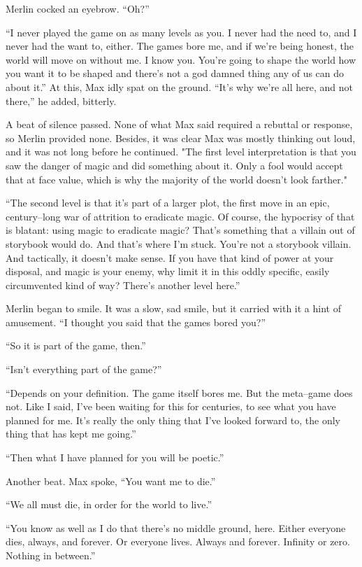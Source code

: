 Merlin cocked an eyebrow. “Oh?”

“I never played the game on as many levels as you. I never had the need to, and I never had the want to, either. The games bore me, and if we’re being honest, the world will move on without me. I know you. You’re going to shape the world how you want it to be shaped and there’s not a god damned thing any of us can do about it.” At this, Max idly spat on the ground. “It’s why we’re all here, and not there,” he added, bitterly.

A beat of silence passed. None of what Max said required a rebuttal or response, so Merlin provided none. Besides, it was clear Max was mostly thinking out loud, and it was not long before he continued. "The first level interpretation is that you saw the danger of magic and did something about it. Only a fool would accept that at face value, which is why the majority of the world doesn’t look farther."

“The second level is that it’s part of a larger plot, the first move in an epic, century\mbox{--}long war of attrition to eradicate magic. Of course, the hypocrisy of that is blatant: using magic to eradicate magic? That’s something that a villain out of storybook would do. And that’s where I’m stuck. You’re not a storybook villain. And tactically, it doesn’t make sense. If you have that kind of power at your disposal, and magic is your enemy, why limit it in this oddly specific, easily circumvented kind of way? There’s another level here.”

Merlin began to smile. It was a slow, sad smile, but it carried with it a hint of amusement. “I thought you said that the games bored you?”

“So it is part of the game, then.”

“Isn’t everything part of the game?”

“Depends on your definition. The game itself bores me. But the meta\mbox{--}game does not. Like I said, I’ve been waiting for this for centuries, to see what you have planned for me. It’s really the only thing that I’ve looked forward to, the only thing that has kept me going.”

“Then what I have planned for you will be poetic.”

Another beat. Max spoke, “You want me to die.”

“We all must die, in order for the world to live.”

“You know as well as I do that there’s no middle ground, here. Either everyone dies, always, and forever. Or everyone lives. Always and forever. Infinity or zero. Nothing in between.”

